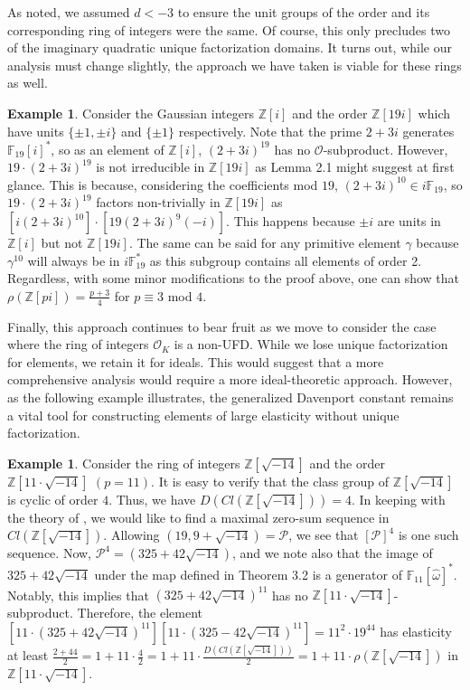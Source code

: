 \documentclass{amsart}
\theoremstyle{definition}
\newtheorem{ex}[lem]{Example}
\newcommand{\MO}{\mathcal{O}}
\newcommand{\bbz}{\mathbb{Z}}
\newcommand{\bbf}{\mathbb{F}}
\numberwithin{equation}{section}
\begin{document}
As noted, we assumed $d < -3$ to ensure the unit groups of the order and its corresponding ring of integers were the same. Of course, this only precludes two of the imaginary quadratic unique factorization domains. It turns out, while our analysis must change slightly, the approach we have taken is viable for these rings as well. 

\begin{ex}

Consider the Gaussian integers $\bbz[i]$ and the order $\bbz[19i]$ which have units $\{\pm 1,\pm i \}$ and $\{\pm1\}$ respectively. Note that the prime $2 + 3i$ generates $\bbf_{19}[i]^*$, so as an element of $\bbz[i]$, $(2+3i)^{19}$ has no $\mathcal{O}$-subproduct. However, $19\cdot (2+3i)^{19}$ is not irreducible in $\bbz[19i]$ as Lemma 2.1 might suggest at first glance. This is because, considering the coefficients mod $19$, $(2 + 3i)^{10} \in i\bbf_{19}$, so $19\cdot (2+3i)^{19}$ factors non-trivially in $\bbz[19i]$ as $[i(2+3i)^{10}]\cdot[19(2+3i)^9(-i)]$. This happens because $\pm i$ are units in $\bbz[i]$ but not $\bbz[19i]$. The same can be said for any primitive element $\gamma$ because $\gamma^{10}$ will always be in $i\bbf_{19}^*$ as this subgroup contains all elements of order 2. Regardless, with some minor modifications to the proof above, one can show that $\rho(\bbz[pi]) = \frac{p+3}{4}$ for $p \equiv 3$ mod $4$.

\end{ex}

Finally, this approach continues to bear fruit as we move to consider the case where the ring of integers $\MO_K$ is a non-UFD. While we lose unique factorization for elements, we retain it for ideals. This would suggest that a more comprehensive analysis would require a more ideal-theoretic approach. However, as the following example illustrates, the generalized Davenport constant remains a vital tool for constructing elements of large elasticity without unique factorization. 

 \begin{ex}
     Consider the ring of integers $\bbz[\sqrt{-14}]$ and the order $\bbz[11\cdot \sqrt{-14}]$ $(p=11)$. It is easy to verify that the class group of $\bbz[\sqrt{-14}]$ is cyclic of order $4$. Thus, we have $D(Cl(\bbz[\sqrt{-14}])) = 4$. In keeping with the theory of \cite{Narkiewicz1995Note}, we would like to find a maximal zero-sum sequence in $Cl(\bbz[\sqrt{-14}])$. Allowing $(19, 9 + \sqrt{-14}) = \mathcal{P}$, we see that $[\mathcal{P}]^4$ is one such sequence. Now, $\mathcal{P}^4 = (325 + 42\sqrt{-14})$, and  we note also that the image of $325 + 42\sqrt{-14}$ under the map defined in Theorem 3.2 is a generator of $\bbf_{11}[\hat{\omega}]^*$. Notably, this implies that $(325 + 42 \sqrt{-14})^{11}$ has no $\bbz[11\cdot \sqrt{-14}]$-subproduct. Therefore, the element $[11\cdot (325 + 42\sqrt{-14})^{11}][11\cdot (325 - 42\sqrt{-14})^{11}] = 11^2\cdot 19^{44}$ has elasticity at least $\frac{2 + 44}{2} = 1 + 11\cdot \frac{4}{2} = 1 + 11\cdot \frac{D(Cl(\bbz[\sqrt{-14}]))}{2} = 1 + 11\cdot \rho(\bbz[\sqrt{-14}])$ in $\bbz[11 \cdot \sqrt{-14}]$.
 \end{ex}   
\end{document}
